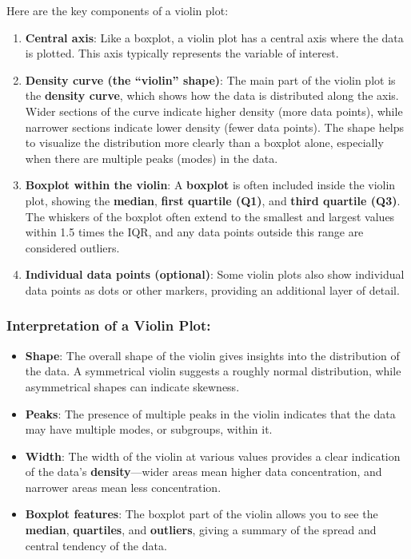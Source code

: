 \documentclass[11pt]{article}
\providecommand{\tightlist}{%
      \setlength{\itemsep}{0pt}\setlength{\parskip}{0pt}}
\begin{document}
Here are the key components of a violin plot:

\begin{enumerate}
\def\labelenumi{\arabic{enumi}.}
\item
  \textbf{Central axis}: Like a boxplot, a violin plot has a central
  axis where the data is plotted. This axis typically represents the
  variable of interest.
\item
  \textbf{Density curve (the ``violin'' shape)}: The main part of the
  violin plot is the \textbf{density curve}, which shows how the data is
  distributed along the axis. Wider sections of the curve indicate
  higher density (more data points), while narrower sections indicate
  lower density (fewer data points). The shape helps to visualize the
  distribution more clearly than a boxplot alone, especially when there
  are multiple peaks (modes) in the data.
\item
  \textbf{Boxplot within the violin}: A \textbf{boxplot} is often
  included inside the violin plot, showing the \textbf{median},
  \textbf{first quartile (Q1)}, and \textbf{third quartile (Q3)}. The
  whiskers of the boxplot often extend to the smallest and largest
  values within 1.5 times the IQR, and any data points outside this
  range are considered outliers.
\item
  \textbf{Individual data points (optional)}: Some violin plots also
  show individual data points as dots or other markers, providing an
  additional layer of detail.
\end{enumerate}

\subsubsection{\texorpdfstring{\textbf{Interpretation of a Violin
Plot}:}{Interpretation of a Violin Plot:}}\label{interpretation-of-a-violin-plot}

\begin{itemize}
\tightlist
\item
  \textbf{Shape}: The overall shape of the violin gives insights into
  the distribution of the data. A symmetrical violin suggests a roughly
  normal distribution, while asymmetrical shapes can indicate skewness.
\item
  \textbf{Peaks}: The presence of multiple peaks in the violin indicates
  that the data may have multiple modes, or subgroups, within it.
\item
  \textbf{Width}: The width of the violin at various values provides a
  clear indication of the data's \textbf{density}---wider areas mean
  higher data concentration, and narrower areas mean less concentration.
\item
  \textbf{Boxplot features}: The boxplot part of the violin allows you
  to see the \textbf{median}, \textbf{quartiles}, and \textbf{outliers},
  giving a summary of the spread and central tendency of the data.
\end{itemize}
\end{document}
